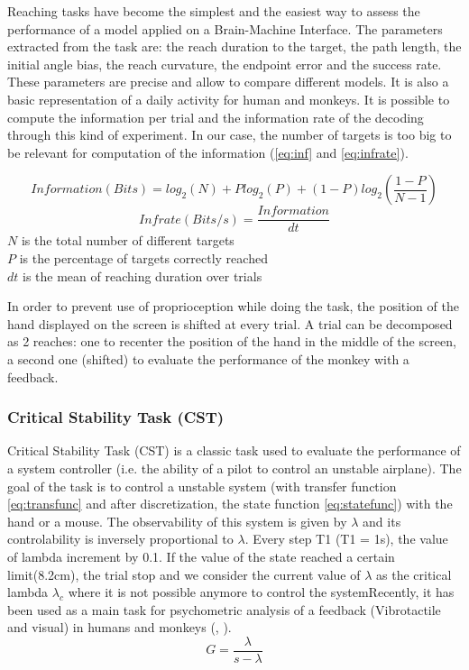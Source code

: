\documentclass[preprint,12pt]{elsarticle}
\begin{document}
Reaching tasks have become the simplest and the easiest way to assess the performance of a model applied on a Brain-Machine Interface. The parameters extracted from the task are: the reach duration to the target, the path length, the initial angle bias, the reach curvature, the endpoint error and the success rate. These parameters are precise and allow to compare different models. It is also a basic representation of a daily activity for human and monkeys. It is possible to compute the information per trial and the information rate of the decoding through this kind of experiment. In our case, the number of targets is too big to be relevant for computation of the information (\ref{eq:inf} and \ref{eq:infrate}). 

\begin{equation} 
Information (Bits) = log_2(N) + Plog_2(P) + (1 - P)log_2(\frac{1-P}{N-1})
\label{eq:inf}
\end{equation}
\begin{equation} 
Infrate (Bits/s) = \frac{Information}{dt}
\label{eq:infrate}
\end{equation}
$N$ is the total number of different targets \\
$P$ is the percentage of targets correctly reached\\
$dt$ is the mean of reaching duration over trials

In order to prevent use of proprioception while doing the task, the position of the hand displayed on the screen is shifted at every trial. A trial can be decomposed as 2 reaches: one to recenter the position of the hand in the middle of the screen, a second one (shifted) to evaluate the performance of the monkey with a feedback.

\subsubsection{Critical Stability Task (CST)}
Critical Stability Task (CST) is a classic task used to evaluate the performance of a system controller (i.e. the ability of a pilot to control an unstable airplane). The goal of the task is to control a unstable system (with transfer function \ref{eq:transfunc} and after discretization, the state function \ref{eq:statefunc}) with the hand or a mouse. The observability of this system is given by $\lambda$ and its controlability is inversely proportional to $\lambda$. Every step T1 (T1 = 1s), the value of lambda increment by 0.1. If the value of the state reached a certain limit(8.2cm), the trial stop and we consider the current value of $\lambda$ as the critical lambda $\lambda_c$ where it is not possible anymore to control the systemRecently, it has been used as a main task for psychometric analysis of a feedback (Vibrotactile and visual) in humans and monkeys (\citet{Quick2014}, \citet{Quick2015}).
\begin{equation} 
G = \frac{\lambda}{s-\lambda}
\label{eq:transfunc}
\end{equation}
\end{document}
